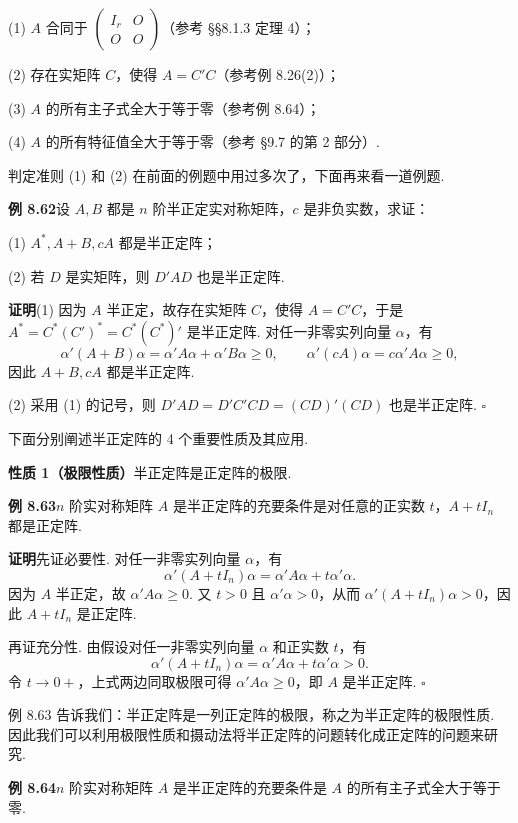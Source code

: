 \documentclass[UTF8, 12pt, fontset=fandol, oneside]{ctexart}
\begin{document}
(1) $A$ 合同于 $\left(\begin{array}{cc}I_r&O\\ O&O\end{array}\right)$（参考 §§8.1.3 定理 4）；

(2) 存在实矩阵 $C$，使得 $A=C'C$（参考例 8.26(2)）；

(3) $A$ 的所有主子式全大于等于零（参考例 8.64）；

(4) $A$ 的所有特征值全大于等于零（参考 §9.7 的第 2 部分）.

判定准则 (1) 和 (2) 在前面的例题中用过多次了，下面再来看一道例题.

\noindent\textbf{例 8.62}\quad 设 $A,B$ 都是 $n$ 阶半正定实对称矩阵，$c$ 是非负实数，求证：

(1) $A^*,A+B,cA$ 都是半正定阵；

(2) 若 $D$ 是实矩阵，则 $D'AD$ 也是半正定阵.

\noindent\textbf{证明}\quad (1) 因为 $A$ 半正定，故存在实矩阵 $C$，使得 $A=C'C$，于是 $A^*=C^*(C')^*=C^*(C^*)'$ 是半正定阵. 对任一非零实列向量 $\alpha$，有
\[
\alpha'(A+B)\alpha=\alpha'A\alpha+\alpha'B\alpha\ge 0,\qquad
\alpha'(cA)\alpha=c\alpha'A\alpha\ge 0,
\]
因此 $A+B,cA$ 都是半正定阵.

(2) 采用 (1) 的记号，则 $D'AD=D'C'CD=(CD)'(CD)$ 也是半正定阵. $\ensuremath{\square}$

下面分别阐述半正定阵的 4 个重要性质及其应用.

\noindent\textbf{性质 1（极限性质）}\quad 半正定阵是正定阵的极限.

\noindent\textbf{例 8.63}\quad $n$ 阶实对称矩阵 $A$ 是半正定阵的充要条件是对任意的正实数 $t$，$A+tI_n$ 都是正定阵.

\noindent\textbf{证明}\quad 先证必要性. 对任一非零实列向量 $\alpha$，有
\[
\alpha'(A+tI_n)\alpha=\alpha'A\alpha+t\alpha'\alpha.
\]
因为 $A$ 半正定，故 $\alpha'A\alpha\ge 0$. 又 $t>0$ 且 $\alpha'\alpha>0$，从而 $\alpha'(A+tI_n)\alpha>0$，因此 $A+tI_n$ 是正定阵.

再证充分性. 由假设对任一非零实列向量 $\alpha$ 和正实数 $t$，有
\[
\alpha'(A+tI_n)\alpha=\alpha'A\alpha+t\alpha'\alpha>0.
\]
令 $t\to 0+$，上式两边同取极限可得 $\alpha'A\alpha\ge 0$，即 $A$ 是半正定阵. $\ensuremath{\square}$

例 8.63 告诉我们：半正定阵是一列正定阵的极限，称之为半正定阵的极限性质. 因此我们可以利用极限性质和摄动法将半正定阵的问题转化成正定阵的问题来研究.

\noindent\textbf{例 8.64}\quad $n$ 阶实对称矩阵 $A$ 是半正定阵的充要条件是 $A$ 的所有主子式全大于等于零.
\end{document}
